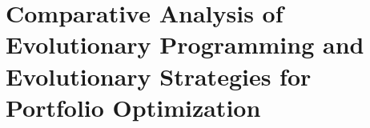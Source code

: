 \usepackage{pdfpages}




\section{Comparative Analysis of Evolutionary Programming and Evolutionary Strategies for Portfolio Optimization}


